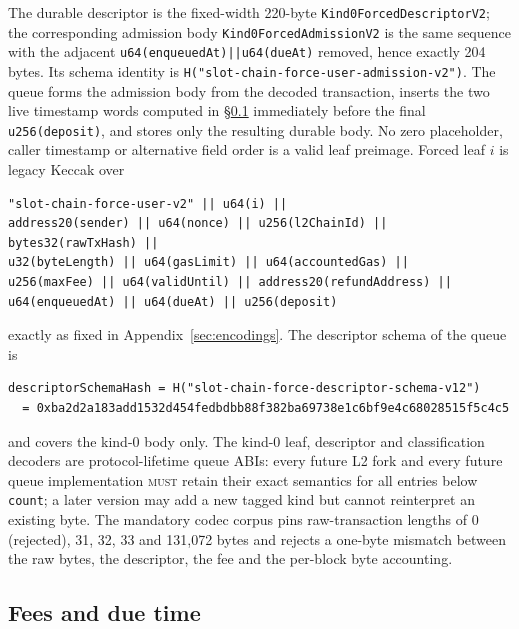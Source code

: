\documentclass[a4paper,11pt]{article}
\newcommand{\code}[1]{\nolinkurl{#1}}
\newcommand{\must}{\textsc{must}}
\begin{document}
The durable descriptor is the fixed-width 220-byte
\code{Kind0ForcedDescriptorV2}; the corresponding admission body
\code{Kind0ForcedAdmissionV2} is the same sequence with the adjacent
\code{u64(enqueuedAt)||u64(dueAt)} removed, hence exactly 204 bytes.  Its
schema identity is \code{H("slot-chain-force-user-admission-v2")}.  The
queue forms the admission body from the decoded transaction, inserts the two
live timestamp words computed in \S\ref{sec:forced-fees} immediately before
the final \code{u256(deposit)}, and stores only the resulting durable body.
No zero placeholder, caller timestamp or alternative field order is a valid
leaf preimage.  Forced leaf $i$ is legacy Keccak over
\begin{verbatim}
"slot-chain-force-user-v2" || u64(i) ||
address20(sender) || u64(nonce) || u256(l2ChainId) || bytes32(rawTxHash) ||
u32(byteLength) || u64(gasLimit) || u64(accountedGas) ||
u256(maxFee) || u64(validUntil) || address20(refundAddress) ||
u64(enqueuedAt) || u64(dueAt) || u256(deposit)
\end{verbatim}
exactly as fixed in Appendix~\ref{sec:encodings}.  The descriptor schema of
the queue is
\begin{verbatim}
descriptorSchemaHash = H("slot-chain-force-descriptor-schema-v12")
  = 0xba2d2a183add1532d454fedbdbb88f382ba69738e1c6bf9e4c68028515f5c4c5
\end{verbatim}
and covers the kind-0 body only.  The kind-0 leaf, descriptor and
classification decoders are protocol-lifetime queue ABIs: every future L2
fork and every future queue implementation \must{} retain their exact
semantics for all entries below \code{count}; a later version may add a new
tagged kind but cannot reinterpret an existing byte.  The mandatory codec
corpus pins raw-transaction lengths of 0 (rejected), 31, 32, 33 and 131,072
bytes and rejects a one-byte mismatch between the raw bytes, the descriptor,
the fee and the per-block byte accounting.

\subsection{Fees and due time}\label{sec:forced-fees}
\end{document}
